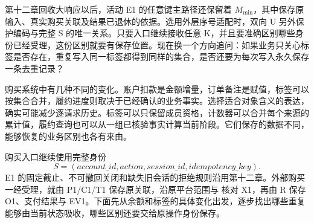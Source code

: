 \newcommand{\CThirteenFigure}[3]{%
  \begin{figure}[htbp]
  \centering
  \begingroup
  \definecolor{Blue}{HTML}{315E76}
  \definecolor{Gold}{HTML}{A96B34}
  \tikzset{every node/.style={font=\small\sffamily,align=center},
    box/.style={draw=Blue,rounded corners=2pt,fill=blue!3,inner sep=6pt,
      text width=3.4cm,minimum height=.8cm},
    good/.style={box,draw=green!35!black,fill=green!4},
    warn/.style={box,draw=Gold,fill=orange!5},
    arr/.style={-{Stealth[length=2mm]},thick,draw=Blue},
    note/.style={font=\footnotesize\sffamily,align=center,text=black!75},
    lane/.style={draw=black!30,densely dashed},
    cell/.style={draw=Blue,minimum width=2.2cm,minimum height=.7cm,
      fill=blue!3,inner sep=3pt}}
  \resizebox{.98\linewidth}{!}{}
  \endgroup
  \caption{#2}\label{#3}
  \end{figure}}

第十二章回收大响应以后，活动 E1 的任意键主路径还保留着 $M_{\min}$，其中保存原输入、真实购买关联及结果已退休的依据。选用外层序号适配时，双向 U 另外保护编码与完整 S 的唯一关系。只要入口继续接收任意 K，并且要准确区别哪些身份已经受理，这份区别就要有保存位置。现在换一个方向追问：如果业务只关心标签是否存在，重复写入同一标签都得到同样的集合，是否还要为每次写入永久保存一条去重记录？

购买系统中有几种不同的变化。账户扣款是金额增量，订单备注是赋值，标签可以按集合合并，履约进度则取决于已经确认的业务事实。选择适合对象含义的表达，确实可能减少逐请求历史。标签可以只保留成员资格，计数器可以合并每个来源的累计值，履约查询也可以从一组已核验事实计算当前阶段。它们保存的数据不同，能够恢复的业务区别也各有来由。

购买入口继续使用完整身份
\[
S=(account\_id,action,session\_id,idempotency\_key).
\]
E1 的固定截止、不可撤回关闭和缺失旧会话的拒绝规则沿用第十二章。外部购买一经受理，就由 P1/C1/T1 保存原关联，沿原平台范围与  核对 X1，再由 R 保存 O1、支付结果与 EV1。下面先从余额和标签的具体变化出发，逐步找出哪些重复能够由当前状态吸收，哪些区别还要交给原操作身份保存。
